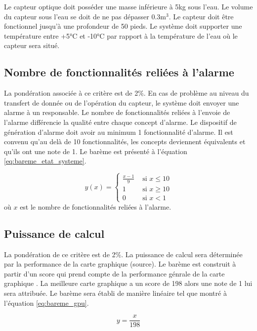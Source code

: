 Le capteur optique doit posséder une masse inférieure à 5kg sous l'eau. Le volume du capteur sous l'eau se doit de ne pas dépasser 0.3m$^{3}$. Le capteur doit être fonctionnel jusqu'à une profondeur de 50 pieds. Le système doit supporter une température entre +5°C et -10°C par rapport à la température de l'eau où le capteur sera situé.


\subsection{Nombre de fonctionnalités reliées à l'alarme}

La pondération associée à ce critère est de 2\%. En cas de problème au niveau du transfert de donnée ou de l'opération du capteur, le système doit envoyer une alarme à un responsable. Le nombre de fonctionnalités reliées à l'envoie de l'alarme différencie la qualité entre chaque concept d'alarme. Le dispositif de génération d'alarme doit avoir au minimum 1 fonctionnalité d'alarme. Il est convenu qu'au delà de 10 fonctionnalités, les concepts deviennent équivalents et qu'ils ont une note de 1. Le barème est présenté à l'équation \ref{eq:bareme_etat_systeme}.

\begin{equation}
    y(x) = \begin{cases}
    \frac{x-1}{9} & \text{ si } x \leq 10\\
    1 & \text{ si } x \geq 10\\
    0 & \text{ si } x < 1
    \end{cases}
    \label{eq:bareme_etat_systeme}
\end{equation}
où $x$ est le nombre de fonctionnalités reliées à l'alarme.

\subsection{Puissance de calcul}

La pondération de ce critère est de 2\%. La puissance de calcul sera déterminée par la performance de la carte graphique (source). Le barème est construit à partir d'un score qui prend compte de la performance génrale de la carte graphique \cite{User_Benchmark_score}. La meilleure carte graphique a un score de 198 alors une note de 1 lui sera attribuée. Le barème sera établi de manière linéaire tel que montré à l'équation \ref{eq:bareme_gpu}.

\begin{equation}
    y = \frac{x}{198}
    \label{eq:bareme_gpu}
\end{equation}

